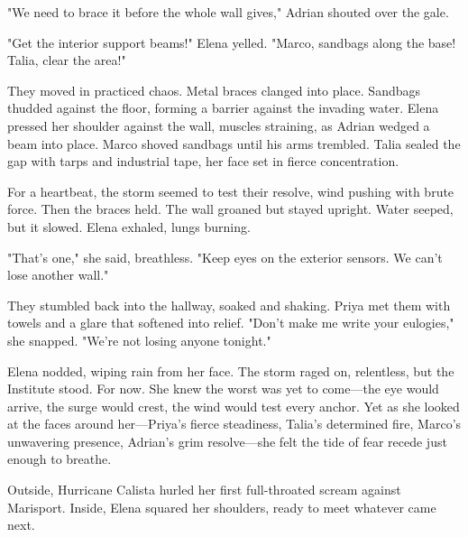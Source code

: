 "We need to brace it before the whole wall gives," Adrian shouted over the gale.

"Get the interior support beams!" Elena yelled. "Marco, sandbags along the base! Talia, clear the area!"

They moved in practiced chaos. Metal braces clanged into place. Sandbags thudded against the floor, forming a barrier against the invading water. Elena pressed her shoulder against the wall, muscles straining, as Adrian wedged a beam into place. Marco shoved sandbags until his arms trembled. Talia sealed the gap with tarps and industrial tape, her face set in fierce concentration.

For a heartbeat, the storm seemed to test their resolve, wind pushing with brute force. Then the braces held. The wall groaned but stayed upright. Water seeped, but it slowed. Elena exhaled, lungs burning.

"That's one," she said, breathless. "Keep eyes on the exterior sensors. We can't lose another wall."

They stumbled back into the hallway, soaked and shaking. Priya met them with towels and a glare that softened into relief. "Don't make me write your eulogies," she snapped. "We're not losing anyone tonight."

Elena nodded, wiping rain from her face. The storm raged on, relentless, but the Institute stood. For now. She knew the worst was yet to come—the eye would arrive, the surge would crest, the wind would test every anchor. Yet as she looked at the faces around her—Priya's fierce steadiness, Talia's determined fire, Marco's unwavering presence, Adrian's grim resolve—she felt the tide of fear recede just enough to breathe.

Outside, Hurricane Calista hurled her first full-throated scream against Marisport. Inside, Elena squared her shoulders, ready to meet whatever came next.
